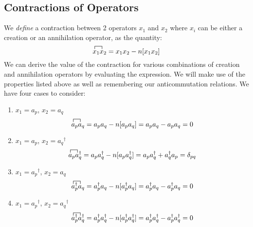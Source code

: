 \documentclass{article}
\newcommand{\dg}{\ensuremath{^\dagger} }
\begin{document}
\subsection{Contractions of Operators}

We \textit{define} a contraction between 2 operators $x_1$ and $x_2$ where $x_i$ can be either a creation or an annihilation operator, as the quantity: 
$$
\contraction{}{x}{{}_1}{x}
x_1 x_2 = x_1x_2 - n[x_1x_2]
$$
We can derive the value of the contraction for various combinations of creation and annihilation operators by evaluating the expression. 
We will make use of the properties listed above as well as remembering our anticommutation relations.
We have four cases to consider: 
\begin{enumerate}
\item $x_1 = a_p$, $x_2 = a_q$ \\
$$
\contraction{}{a}{{}_p}{a}
a_p a_q = a_p a_q  - n[a_p a_q] = a_p a_q  - a_p a_q  = 0 
$$
\item $x_1 = a_p$, $x_2 = a_q\dg$ \\
$$
\contraction{}{a}{{}_p}{a}
a_p a_q\dg = a_p a_q\dg  - n[a_p a_q\dg] = a_p a_q\dg  +  a_q\dg a_p = \delta_{pq}
$$
\item $x_1 = a_p\dg$, $x_2 = a_q$ \\
$$
\contraction{}{a}{{}_p}{a}
a_p\dg a_q = a_p\dg a_q  - n[a_p\dg a_q] = a_p\dg a_q  - a_p\dg a_q  = 0 
$$
\item $x_1 = a_p\dg$, $x_2 = a_q\dg$ \\
$$
\contraction{}{a}{{}_p}{a}
a_p\dg a_q\dg = a_p\dg a_q\dg  - n[a_p\dg a_q\dg] = a_p\dg a_q\dg  - a_p\dg a_q\dg  = 0 
$$

\end{enumerate}
\end{document}
